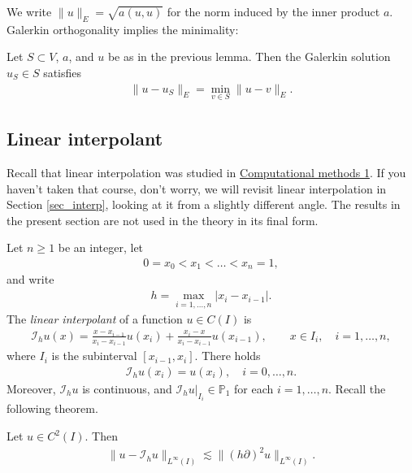 \documentclass[12pt,oneside]{amsart}
\def\I{\mathcal I}
\begin{document}
We write $\|u\|_E = \sqrt{a(u,u)}$ for the norm induced by the inner product $a$. Galerkin orthogonality implies the minimality:

\begin{corollary}\label{cor_abs_err}
Let $S \subset V$, $a$, and $u$ be as in the previous lemma. 
Then the Galerkin solution $u_S \in S$ satisfies
    \begin{align*}
\|u-u_S\|_E = \min_{v \in S} \|u - v\|_E.
    \end{align*}
\end{corollary}

\subsection{Linear interpolant}

Recall that linear interpolation was studied in \href{https://github.com/uh-comp-methods1/notebooks/blob/main/interpolation/lecture.ipynb}{Computational methods 1}. If you haven't taken that course, don't worry, we will revisit linear interpolation in Section \ref{sec_interp}, looking at it from a slightly different angle. The results in the present section are not used in the theory in its final form. 

Let $n \ge 1$ be an integer, let 
    \begin{align}\label{def_mesh}
0 = x_0 < x_1 < \dots < x_n = 1,
    \end{align}
and write
    \begin{align}\label{def_mesh_size}
h = \max_{i=1,\dots,n} |x_i - x_{i-1}|.
    \end{align}
The {\em linear interpolant} of a function $u \in C(I)$ is 
    \begin{align*}
\I_h u(x) = \frac{x - x_{i-1}}{x_i - x_{i-1}} u(x_i) + \frac{x_{i} - x}{x_i - x_{i-1}} u(x_{i-1}), \qquad x \in I_i, \quad i = 1,\dots,n,
    \end{align*}
where $I_i$ is the subinterval $[x_{i-1}, x_i]$.
There holds 
    \begin{align*}
\I_h u(x_i) = u(x_i), \quad i=0,\dots,n.
    \end{align*}
Moreover, $\I_h u$ is continuous, and $\I_h u|_{I_i} \in \mathbb P_1$ for each $i=1,\dots,n$. 
Recall the following theorem.

\begin{theorem}
Let $u \in C^2(I)$. Then 
    \begin{align*}
\|u - \I_h u\|_{L^\infty(I)} \lesssim \|(h \partial)^2 u\|_{L^\infty(I)}.
    \end{align*}
\end{theorem}
\end{document}
